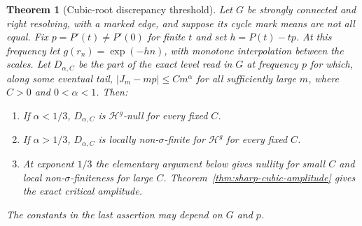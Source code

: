 \documentclass[11pt]{article}
\newtheorem{theorem}{Theorem}
\theoremstyle{definition}
\theoremstyle{remark}
\begin{document}
\begin{theorem}[Cubic-root discrepancy threshold]
\label{thm:cubic-root-threshold}
Let $G$ be strongly connected and right resolving, with a marked
edge, and suppose its cycle mark means are not all equal.
Fix $p=P'(t)\ne P'(0)$ for finite $t$ and set
$h=P(t)-tp$. At this frequency let $g(r_n)=\exp(-hn)$,
with monotone interpolation between the scales.
Let $D_{\alpha,C}$ be the part of the exact level read in $G$
at frequency $p$ for which, along some eventual tail,
$|J_m-mp|\le C m^\alpha$ for all sufficiently large $m$,
where $C>0$ and $0<\alpha<1$.
Then:
\begin{enumerate}
\item If $\alpha<1/3$, $D_{\alpha,C}$ is $\mathcal H^g$-null
for every fixed $C$.
\item If $\alpha>1/3$, $D_{\alpha,C}$ is locally
non-$\sigma$-finite for $\mathcal H^g$ for every fixed $C$.
\item At exponent $1/3$ the elementary argument below gives nullity
for small $C$ and local non-$\sigma$-finiteness for large $C$.
Theorem~\ref{thm:sharp-cubic-amplitude} gives the exact
critical amplitude.
\end{enumerate}
The constants in the last assertion may depend on $G$ and $p$.
\end{theorem}
\end{document}
